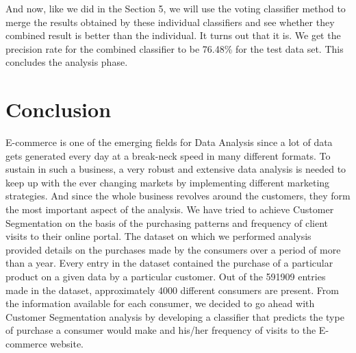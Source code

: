 And now, like we did in the Section 5, we will use the voting classifier method to merge the results obtained by these individual classifiers and see whether they combined result is better than the individual. It turns out that it is. We get the precision rate for the combined classifier to be 76.48\% for the test data set. This concludes the analysis phase.\\

\section{Conclusion}
E-commerce is one of the emerging fields for Data Analysis since a lot of data gets generated every day at a break-neck speed in many different formats. To sustain in such a business, a very robust and extensive data analysis is needed to keep up with the ever changing markets by implementing different marketing strategies. And since the whole business revolves around the customers, they form the most important aspect of the analysis. We have tried to achieve Customer Segmentation on the basis of the purchasing patterns and frequency of client visits to their online portal. The dataset on which we performed analysis provided details on the purchases made by the consumers over a period of more than a year. Every entry in the dataset contained the purchase of a particular product on a given data by a particular customer. Out of the 591909 entries made in the dataset, approximately 4000 different consumers are present. From the information available for each consumer, we decided to go ahead with Customer Segmentation analysis by developing a classifier that predicts the type of purchase a consumer would make and his/her frequency of visits to the E-commerce website. \\

